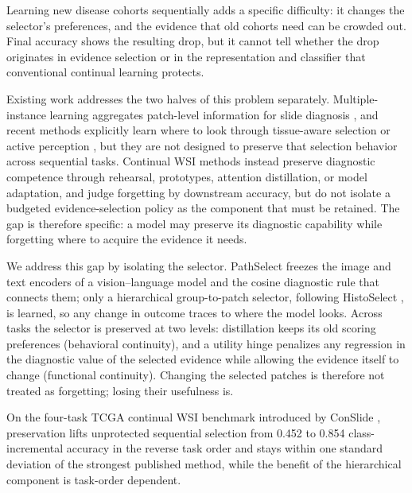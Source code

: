\documentclass{article}
\begin{document}
Learning new disease cohorts sequentially adds a specific difficulty: it changes the selector's preferences, and the evidence that old cohorts need can be crowded out. Final accuracy shows the resulting drop, but it cannot tell whether the drop originates in evidence selection or in the representation and classifier that conventional continual learning protects.

Existing work addresses the two halves of this problem separately. Multiple-instance learning aggregates patch-level information for slide diagnosis \cite{ilse2018abmil,lu2021clam,shao2021transmil}, and recent methods explicitly learn where to look through tissue-aware selection \cite{huang2026histoselect} or active perception \cite{chen2026adaptivepath}, but they are not designed to preserve that selection behavior across sequential tasks. Continual WSI methods \cite{huang2023conslide,meseguer2024micil,gou2025qpmil,li2025akd,lee2025comel,bui2026mergeslide} instead preserve diagnostic competence through rehearsal, prototypes, attention distillation, or model adaptation, and judge forgetting by downstream accuracy, but do not isolate a budgeted evidence-selection policy as the component that must be retained. The gap is therefore specific: a model may preserve its diagnostic capability while forgetting where to acquire the evidence it needs.

We address this gap by isolating the selector. PathSelect freezes the image and text encoders of a vision--language model and the cosine diagnostic rule that connects them; only a hierarchical group-to-patch selector, following HistoSelect \cite{huang2026histoselect}, is learned, so any change in outcome traces to where the model looks. Across tasks the selector is preserved at two levels: distillation keeps its old scoring preferences (behavioral continuity), and a utility hinge penalizes any regression in the diagnostic value of the selected evidence while allowing the evidence itself to change (functional continuity). Changing the selected patches is therefore not treated as forgetting; losing their usefulness is.

On the four-task TCGA continual WSI benchmark introduced by ConSlide \cite{huang2023conslide}, preservation lifts unprotected sequential selection from 0.452 to 0.854 class-incremental accuracy in the reverse task order and stays within one standard deviation of the strongest published method, while the benefit of the hierarchical component is task-order dependent.
\end{document}
